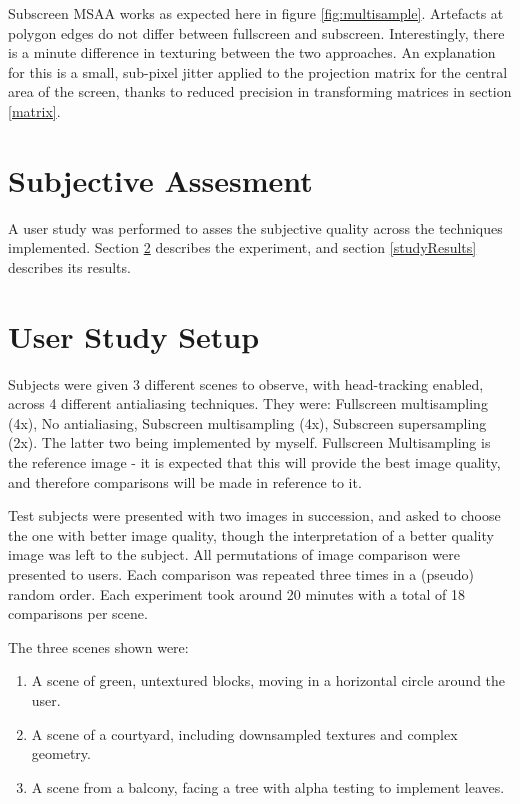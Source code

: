 \documentclass[12pt,a4paper,twoside,openright]{report}
\begin{document}
Subscreen MSAA works as expected here in figure \ref{fig:multisample}. Artefacts at polygon edges do not differ between fullscreen and subscreen. Interestingly, there is a minute difference in texturing between the two approaches. An explanation for this is a small, sub-pixel jitter applied to the projection matrix for the central area of the screen, thanks to reduced precision in transforming matrices in section \ref{matrix}.

\section{Subjective Assesment}
A user study was performed to asses the subjective quality across the techniques implemented. Section \ref{studySetup} describes the experiment, and section \ref{studyResults} describes its results.

\section{User Study Setup}\label{studySetup}

Subjects were given 3 different scenes to observe, with head-tracking enabled, across 4 different antialiasing techniques. They were: Fullscreen multisampling (4x), No antialiasing, Subscreen multisampling (4x), Subscreen supersampling (2x). The latter two being implemented by myself. Fullscreen Multisampling is the reference image - it is expected that this will provide the best image quality, and therefore comparisons will be made in reference to it.

Test subjects were presented with two images in succession, and asked to choose the one with better image quality, though the interpretation of a better quality image was left to the subject. All permutations of image comparison were presented to users. Each comparison was repeated three times in a (pseudo) random order. Each experiment took around 20 minutes with a total of 18 comparisons per scene.

The three scenes shown were:

\begin{enumerate}
\item A scene of green, untextured blocks, moving in a horizontal circle around the user.

\item A scene of a courtyard, including downsampled textures and complex geometry.

\item A scene from a balcony, facing a tree with alpha testing to implement leaves.
\end{enumerate}
\end{document}
